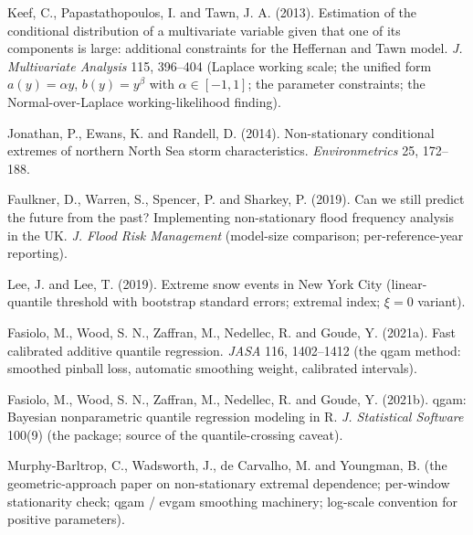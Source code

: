 \documentclass[11pt]{article}
\begin{document}
{\color{green}Keef, C., Papastathopoulos, I. and Tawn, J. A. (2013). Estimation of the conditional distribution of a multivariate variable given that one of its components is large: additional constraints for the Heffernan and Tawn model. \textit{J. Multivariate Analysis} 115, 396--404 (Laplace working scale; the unified form $a(y) = \alpha y$, $b(y) = y^{\beta}$ with $\alpha \in [-1, 1]$; the parameter constraints; the Normal-over-Laplace working-likelihood finding).}

Jonathan, P., Ewans, K. and Randell, D. (2014). Non-stationary conditional extremes of northern North Sea storm characteristics. \textit{Environmetrics} 25, 172--188.

Faulkner, D., Warren, S., Spencer, P. and Sharkey, P. (2019). Can we still predict the future from the past? Implementing non-stationary flood frequency analysis in the UK. \textit{J. Flood Risk Management} (model-size comparison; per-reference-year reporting).

Lee, J. and Lee, T. (2019). Extreme snow events in New York City (linear-quantile threshold with bootstrap standard errors; extremal index; $\xi = 0$ variant).

{\color{green}Fasiolo, M., Wood, S. N., Zaffran, M., Nedellec, R. and Goude, Y. (2021a). Fast calibrated additive quantile regression. \textit{JASA} 116, 1402--1412 (the qgam method: smoothed pinball loss, automatic smoothing weight, calibrated intervals).}

{\color{green}Fasiolo, M., Wood, S. N., Zaffran, M., Nedellec, R. and Goude, Y. (2021b). qgam: Bayesian nonparametric quantile regression modeling in R. \textit{J. Statistical Software} 100(9) (the package; source of the quantile-crossing caveat).}

Murphy-Barltrop, C., Wadsworth, J., de Carvalho, M. and Youngman, B. (the geometric-approach paper on non-stationary extremal dependence; per-window stationarity check; qgam / evgam smoothing machinery; log-scale convention for positive parameters).
\end{document}
